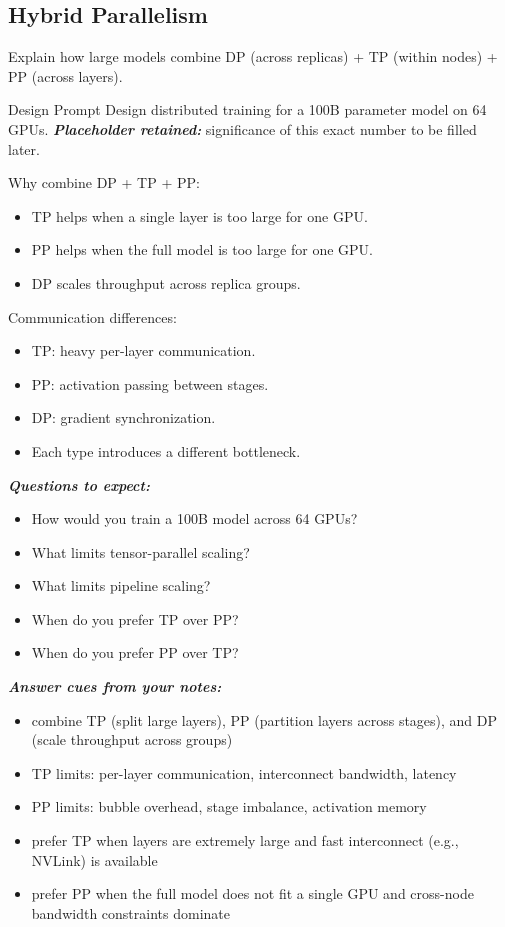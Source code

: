 \documentclass[12pt]{article}
\let\origtextbf\textbf
\renewcommand{\textbf}[1]{\origtextbf{\textit{#1}}}
\begin{document}
\subsection{Hybrid Parallelism}
Explain how large models combine DP (across replicas) + TP (within nodes) + PP (across layers).

\vspace{2cm}

\begin{greenbox}{Design Prompt}
Design distributed training for a 100B parameter model on 64 GPUs.
\textbf{Placeholder retained:} significance of this exact number to be filled later.

Why combine DP + TP + PP:
\begin{itemize}
\item TP helps when a single layer is too large for one GPU.
\item PP helps when the full model is too large for one GPU.
\item DP scales throughput across replica groups.
\end{itemize}

Communication differences:
\begin{itemize}
\item TP: heavy per-layer communication.
\item PP: activation passing between stages.
\item DP: gradient synchronization.
\item Each type introduces a different bottleneck.
\end{itemize}
\end{greenbox}

\textbf{Questions to expect:}
\begin{itemize}
\item How would you train a 100B model across 64 GPUs?
\item What limits tensor-parallel scaling?
\item What limits pipeline scaling?
\item When do you prefer TP over PP?
\item When do you prefer PP over TP?
\end{itemize}

\textbf{Answer cues from your notes:}
\begin{itemize}
\item combine TP (split large layers), PP (partition layers across stages), and DP (scale throughput across groups)
\item TP limits: per-layer communication, interconnect bandwidth, latency
\item PP limits: bubble overhead, stage imbalance, activation memory
\item prefer TP when layers are extremely large and fast interconnect (e.g., NVLink) is available
\item prefer PP when the full model does not fit a single GPU and cross-node bandwidth constraints dominate
\end{itemize}
\end{document}
